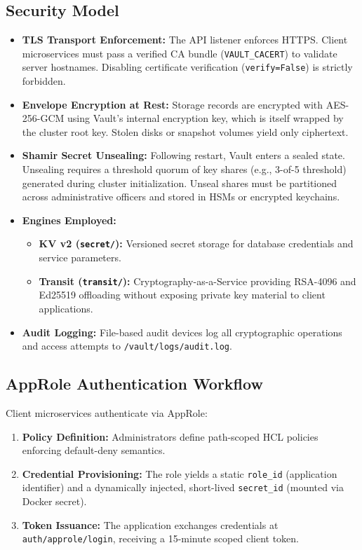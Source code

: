 \documentclass[11pt,a4paper]{article}
\begin{document}
\subsection{Security Model}
\begin{itemize}[leftmargin=*,itemsep=2pt]
  \item \textbf{TLS Transport Enforcement:} The API listener enforces HTTPS. Client microservices must pass a verified CA bundle (\texttt{VAULT\_CACERT}) to validate server hostnames. Disabling certificate verification (\texttt{verify=False}) is strictly forbidden.
  \item \textbf{Envelope Encryption at Rest:} Storage records are encrypted with AES-256-GCM using Vault's internal encryption key, which is itself wrapped by the cluster root key. Stolen disks or snapshot volumes yield only ciphertext.
  \item \textbf{Shamir Secret Unsealing:} Following restart, Vault enters a sealed state. Unsealing requires a threshold quorum of key shares (e.g., 3-of-5 threshold) generated during cluster initialization. Unseal shares must be partitioned across administrative officers and stored in HSMs or encrypted keychains.
  \item \textbf{Engines Employed:}
    \begin{itemize}
      \item \textbf{KV v2 (\texttt{secret/}):} Versioned secret storage for database credentials and service parameters.
      \item \textbf{Transit (\texttt{transit/}):} Cryptography-as-a-Service providing RSA-4096 and Ed25519 offloading without exposing private key material to client applications.
    \end{itemize}
  \item \textbf{Audit Logging:} File-based audit devices log all cryptographic operations and access attempts to \texttt{/vault/logs/audit.log}.
\end{itemize}

\subsection{AppRole Authentication Workflow}
Client microservices authenticate via AppRole:
\begin{enumerate}[leftmargin=*,itemsep=2pt]
  \item \textbf{Policy Definition:} Administrators define path-scoped HCL policies enforcing default-deny semantics.
  \item \textbf{Credential Provisioning:} The role yields a static \texttt{role\_id} (application identifier) and a dynamically injected, short-lived \texttt{secret\_id} (mounted via Docker secret).
  \item \textbf{Token Issuance:} The application exchanges credentials at \texttt{auth/approle/login}, receiving a 15-minute scoped client token.
\end{enumerate}
\end{document}
